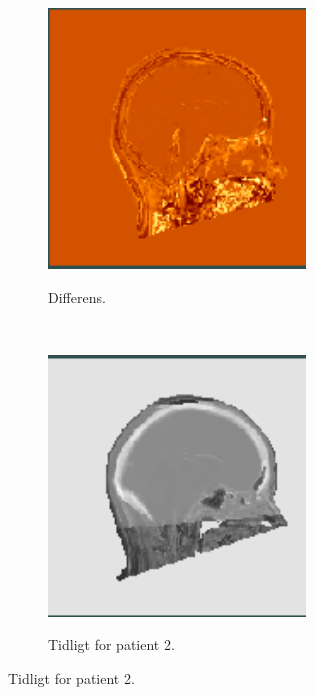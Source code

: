 \begin{figure}
\begin{subfigure}[b]{0.3\textwidth}
        \label{col:over_time_sct_pat1_late}
    \end{subfigure}\hfill
    \begin{subfigure}[b]{0.3\textwidth}
        \caption{Differens.}
        \includegraphics[width=0.75\textwidth]{colager/over_tid_sct/over_tid_sct_121280_sub.png}
        \label{col:over_time_sct_pat1_sub}
    \end{subfigure}\\
    \begin{subfigure}[b]{0.3\textwidth}
        \caption{Tidligt for patient 2.}
        \includegraphics[width=0.75\textwidth]{colager/over_tid_sct/over_tid_sct_140547_early.png}
        \label{col:over_time_sct_pat2_early}

\end{subfigure}
\end{figure}
